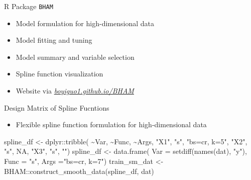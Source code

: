 \documentclass[
  ignorenonframetext,
  aspectratio=169]{beamer}
\newenvironment{Shaded}{\begin{snugshade}}{\end{snugshade}}
\newcommand{\AttributeTok}[1]{\textcolor[rgb]{0.77,0.63,0.00}{#1}}
\newcommand{\ConstantTok}[1]{\textcolor[rgb]{0.00,0.00,0.00}{#1}}
\newcommand{\FunctionTok}[1]{\textcolor[rgb]{0.00,0.00,0.00}{#1}}
\newcommand{\NormalTok}[1]{#1}
\newcommand{\OtherTok}[1]{\textcolor[rgb]{0.56,0.35,0.01}{#1}}
\newcommand{\SpecialCharTok}[1]{\textcolor[rgb]{0.00,0.00,0.00}{#1}}
\newcommand{\StringTok}[1]{\textcolor[rgb]{0.31,0.60,0.02}{#1}}
\providecommand{\tightlist}{%
  \setlength{\itemsep}{0pt}\setlength{\parskip}{0pt}}
\begin{document}
\begin{frame}{R Package \texttt{BHAM}}
\begin{itemize}
\tightlist
\item
  Model formulation for high-dimensional data
\item
  Model fitting and tuning
\item
  Model summary and variable selection
\item
  Spline function visualization
\item
  Website via
  \href{https://boyiguo1.github.io/BHAM/}{\emph{boyiguo1.github.io/BHAM}}
\end{itemize}
\end{frame}

\begin{frame}[fragile]{Design Matrix of Spline Fucntions}
\protect\hypertarget{design-matrix-of-spline-fucntions}{}
\begin{itemize}
\tightlist
\item
  Flexible spline function formulation for high-dimensional data
\end{itemize}

\begin{Shaded}
\begin{Highlighting}[]
\NormalTok{spline\_df }\OtherTok{\textless{}{-}}\NormalTok{ dplyr}\SpecialCharTok{::}\FunctionTok{tribble}\NormalTok{(}
    \SpecialCharTok{\textasciitilde{}}\NormalTok{Var, }\SpecialCharTok{\textasciitilde{}}\NormalTok{Func, }\SpecialCharTok{\textasciitilde{}}\NormalTok{Args,}
    \StringTok{"X1"}\NormalTok{,  }\StringTok{"s"}\NormalTok{, }\StringTok{"bs=\textquotesingle{}cr\textquotesingle{}, k=5"}\NormalTok{,}
    \StringTok{"X2"}\NormalTok{,  }\StringTok{"s"}\NormalTok{, }\ConstantTok{NA}\NormalTok{,}
    \StringTok{"X3"}\NormalTok{,  }\StringTok{"s"}\NormalTok{, }\StringTok{""}\NormalTok{)}
\NormalTok{spline\_df }\OtherTok{\textless{}{-}} \FunctionTok{data.frame}\NormalTok{(}
    \AttributeTok{Var =} \FunctionTok{setdiff}\NormalTok{(}\FunctionTok{names}\NormalTok{(dat), }\StringTok{"y"}\NormalTok{),}
    \AttributeTok{Func =} \StringTok{"s"}\NormalTok{,}
    \AttributeTok{Args =}\StringTok{"bs=\textquotesingle{}cr\textquotesingle{}, k=7"}\NormalTok{)}
\NormalTok{train\_sm\_dat }\OtherTok{\textless{}{-}}\NormalTok{ BHAM}\SpecialCharTok{::}\FunctionTok{construct\_smooth\_data}\NormalTok{(spline\_df, dat)}
\end{Highlighting}
\end{Shaded}
\end{frame}
\end{document}

